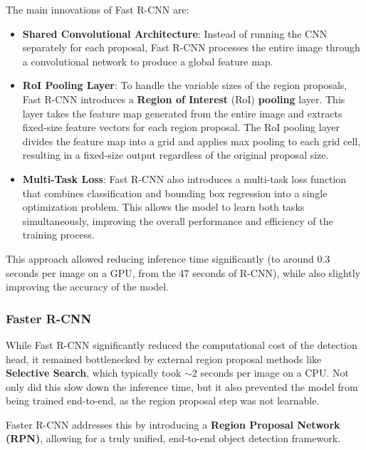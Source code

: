 The main innovations of Fast R-CNN are:
\begin{itemize}
    \item \textbf{Shared Convolutional Architecture}: Instead of running the CNN separately for each proposal, 
    Fast R-CNN processes the entire image through a convolutional network to produce a global feature map. 
    
    \item \textbf{RoI Pooling Layer}: To handle the variable sizes of the region proposals, Fast R-CNN introduces a \textbf{Region of Interest} (RoI) \textbf{pooling} layer.
    This layer takes the feature map generated from the entire image and extracts fixed-size feature vectors for each region proposal.
    The RoI pooling layer divides the feature map into a grid and applies max pooling to each grid cell, resulting in a fixed-size output regardless of the original proposal size.
    
    \item \textbf{Multi-Task Loss}: Fast R-CNN also introduces a multi-task loss function that combines classification and bounding box regression into a single optimization problem.
    This allows the model to learn both tasks simultaneously, improving the overall performance and efficiency of the training process.
\end{itemize}

This approach allowed reducing inference time significantly (to around 0.3 seconds per image on a GPU, from the 47 seconds of R-CNN), while also slightly improving the accuracy of the model.

\subsubsection{Faster R-CNN}
While Fast R-CNN significantly reduced the computational cost of the detection head, it remained bottlenecked by external region proposal 
methods like \textbf{Selective Search}, which typically took $\sim 2$ seconds per image on a CPU. 
Not only did this slow down the inference time, but it also prevented the model from being trained end-to-end, as the region proposal step was not learnable.

Faster R-CNN addresses this by introducing a \textbf{Region Proposal Network (RPN)}, allowing for a truly unified, end-to-end object detection framework.

